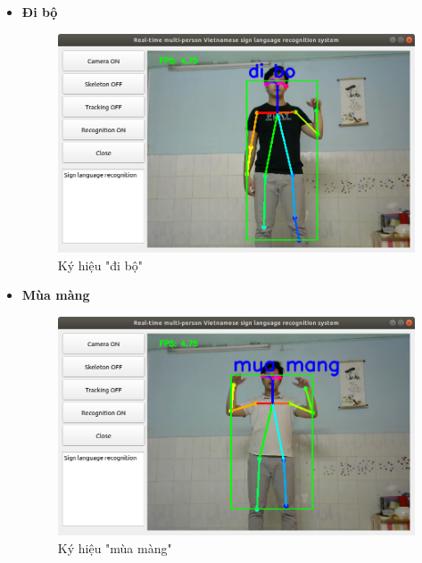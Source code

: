\documentclass[12pt,a4paper,oneside]{book}
\numberwithin{equation}{chapter} %
\numberwithin{figure}{chapter} %
\numberwithin{table}{chapter} %
\begin{document}
\begin{itemize}
\item \textbf{Đi bộ}
\FloatBarrier
\begin{figure}[htp]
\begin{center}
\includegraphics[scale=0.4]{kq/di_bo.png}
\end{center}
\caption{Ký hiệu "đi bộ"}
\end{figure}
\FloatBarrier

\item \textbf{Mùa màng}
\FloatBarrier
\begin{figure}[htp]
\begin{center}
\includegraphics[scale=0.4]{kq/mua_mang.png}
\end{center}
\caption{Ký hiệu "mùa màng"}
\end{figure}
\FloatBarrier

\thispagestyle{phuluc}
\pagebreak


\end{itemize}
\end{document}
